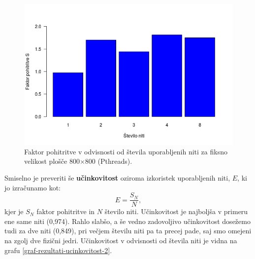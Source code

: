 \documentclass[a4paper,titlepage,11pt]{article}
\begin{document}
\begin{figure}[H]
\begin{center}
\includegraphics[scale=0.55]{graf-rezultati-2_2.png}
\caption{Faktor pohitritve v odvisnosti od števila uporabljenih niti za fiksno velikost plošče 800$\times$800 (Pthreads).}
\label{graf-rezultati-pohitritev-2}
\end{center}
\vspace{-25pt}
\end{figure}

Smiselno je preveriti še \textbf{učinkovitost} oziroma izkoristek uporabljenih niti, $E$, ki jo izračunamo kot:
\begin{equation} \label{enacba-ucinkovitost}
E = \frac{S_N}{N},
\end{equation}
kjer je $S_N$ faktor pohitritve in $N$ število niti. Učinkovitost je najboljša v primeru ene same niti (0,974). Rahlo slabšo, a še vedno zadovoljivo učinkovitost dosežemo tudi za dve niti (0,849), pri večjem številu niti pa ta precej pade, saj smo omejeni na zgolj dve fizični jedri. Učinkovitost v odvisnosti od števila niti je vidna na grafu \ref{graf-rezultati-ucinkovitost-2}.
\end{document}
